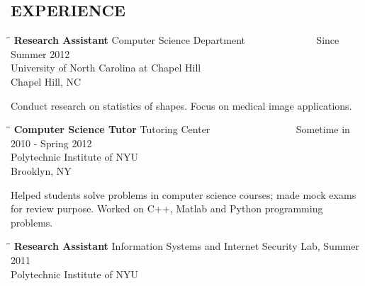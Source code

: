 \documentclass{res}
\begin{document}
\begin{resume}
\section{EXPERIENCE}
   \vspace{-0.1in}	
   \begin{tabbing}
   \hspace{2.3in}\= \hspace{2.6in}\= \kill %
    {\bf Research Assistant} \>Computer Science Department ~~~~~~~~~~~~~  Since Summer 2012\\
    \> University of North Carolina at Chapel Hill  \\
                          \>Chapel Hill, NC
   \end{tabbing}\vspace{-20pt}
    Conduct research on statistics of shapes. Focus on medical image applications. 
   \vspace{-0.1in}	
   \begin{tabbing}
   \hspace{2.3in}\= \hspace{2.6in}\= \kill %
    {\bf Computer Science Tutor} \>Tutoring Center ~~~~~~~~~~~~~~~~ Sometime in 2010 - Spring 2012\\
    \> Polytechnic Institute of NYU\\
                          \>Brooklyn, NY
   \end{tabbing}\vspace{-20pt}
    Helped students solve problems in computer science courses; made mock exams for review purpose. Worked on C++, Matlab and Python programming problems.
       \begin{tabbing}
   \hspace{2.3in}\= \hspace{2.6in}\= \kill %
    {\bf Research Assistant} \> Information Systems and Internet Security Lab, Summer 2011 \\
    \>Polytechnic Institute of NYU  \\


\end{tabbing}
\end{resume}
\end{document}
